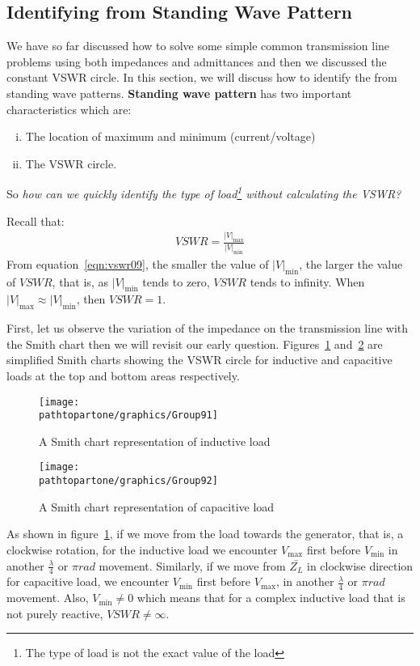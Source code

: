 \subsection{Identifying  from Standing Wave Pattern}\label{lec:lec9}

We have so far discussed how to solve some simple common transmission line problems using both impedances and admittances and then we discussed the constant VSWR circle. In this section, we will discuss how to identify the  from standing wave patterns. \textbf{Standing wave pattern} has two important characteristics which are:
\begin{enumerate}[(i)]
\item The location of maximum and minimum (current/voltage)
\item The VSWR circle.
\end{enumerate}
So \emph{how can we quickly identify the type of load\footnote{The type of load is not the exact value of the load} without calculating the VSWR?}

Recall that:
\begin{align}
VSWR = \frac{|V|_\max}{|V|_\min}
\label{eqn:vswr09}
\end{align}
From equation~\eqref{eqn:vswr09}, the smaller the value of $|V|_\min$, the larger the value of ${VSWR}$, that is, as $|V|_\min$ tends to zero, ${VSWR}$ tends to infinity. When $|V|_\max{\approx}|V|_\min$, then $VSWR = 1$.

First, let us observe the variation of the impedance on the transmission line with the Smith chart then we will revisit our early question. Figures~\ref{fig:group91} and~\ref{fig:group92} are simplified Smith charts showing the VSWR circle for inductive and capacitive loads at the top and bottom areas respectively.
\begin{figure}[h]
\centering
\texttt{[image: \\pathtopartone/graphics/Group91]}
\caption{A Smith chart representation of inductive load}
\label{fig:group91}
\end{figure}
\begin{figure}[h]
\centering
\texttt{[image: \\pathtopartone/graphics/Group92]}
\caption{A Smith chart representation of capacitive load}
\label{fig:group92}
\end{figure}

As shown in figure~\ref{fig:group91}, if we move from the load towards the generator, that is, a clockwise rotation, for the inductive load we encounter $V_\max$ first before ${V_\min}$ in another $\frac{\lambda}{4}$ or $\pi rad$ movement. Similarly, if we move from $\bar{Z_L}$ in clockwise direction for capacitive load, we encounter $V_\min$ first before $V_\max$, in another $\frac{\lambda}{4}$ or $\pi rad$ movement. Also, $V_\min\neq0$ which means that for a complex inductive load that is not purely reactive, $VSWR\neq\infty$.

